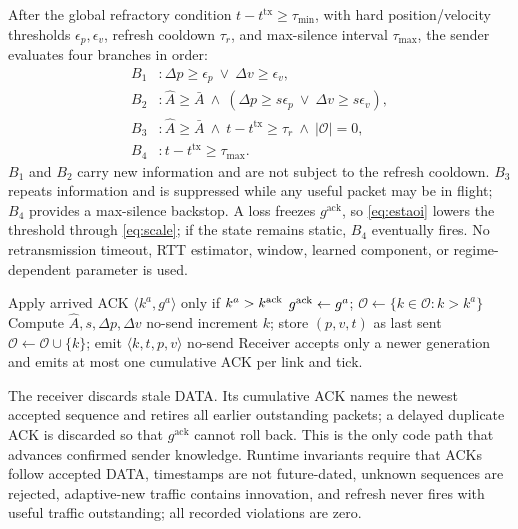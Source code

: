 After the global refractory condition
$t-t^{\mathrm{tx}}\geq\tau_{\min}$, with hard position/velocity thresholds
$\epsilon_p,\epsilon_v$, refresh cooldown $\tau_r$, and max-silence interval
$\tau_{\max}$, the sender evaluates four branches in order:
\begin{align}
 B_1 &: \Delta p\geq\epsilon_p\ \vee\ \Delta v\geq\epsilon_v,
 \label{eq:hard}\\
 B_2 &: \widehat A\geq\bar A\ \wedge\
 (\Delta p\geq s\epsilon_p\ \vee\ \Delta v\geq s\epsilon_v),
 \label{eq:adaptive}\\
 B_3 &: \widehat A\geq\bar A\ \wedge\
 t-t^{\mathrm{tx}}\geq\tau_r\ \wedge\ |\mathcal O|=0,
 \label{eq:refresh}\\
 B_4 &: t-t^{\mathrm{tx}}\geq\tau_{\max}.
 \label{eq:maxsilence}
\end{align}
$B_1$ and $B_2$ carry new information and are not subject to the refresh
cooldown. $B_3$ repeats information and is suppressed while any useful packet
may be in flight; $B_4$ provides a max-silence backstop. A loss freezes
$g^{\mathrm{ack}}$, so \eqref{eq:estaoi} lowers the threshold through
\eqref{eq:scale}; if the state remains static, $B_4$ eventually fires. No
retransmission timeout, RTT estimator, window, learned component, or
regime-dependent parameter is used.

\begin{algorithm}[t]
\caption{Sender and cumulative-ACK update, per channel}
\label{alg:sender}
\begin{algorithmic}[1]
\State Apply arrived ACK $\langle k^a,g^a\rangle$ only if $k^a>k^{\rm ack}$
\State $g^{\rm ack}\gets g^a$;
$\mathcal O\gets\{k\in\mathcal O:k>k^a\}$
\State Compute $\widehat A,s,\Delta p,\Delta v$
\If{$t-t^{\rm tx}<\tau_{\min}$} \State \Return no-send \EndIf
\If{$B_1$ or $B_2$ or $B_3$ or $B_4$}
 \State increment $k$; store $(p,v,t)$ as last sent
 \State $\mathcal O\gets\mathcal O\cup\{k\}$; emit $\langle k,t,p,v\rangle$
\Else \State \Return no-send \EndIf
\State Receiver accepts only a newer generation and emits at most one
cumulative ACK per link and tick.
\end{algorithmic}
\end{algorithm}

The receiver discards stale DATA. Its cumulative ACK names the newest accepted
sequence and retires all earlier outstanding packets; a delayed duplicate ACK
is discarded so that $g^{\mathrm{ack}}$ cannot roll back. This is the only
code path that advances confirmed sender knowledge. Runtime invariants require
that ACKs follow accepted DATA, timestamps are not future-dated, unknown
sequences are rejected, adaptive-new traffic contains innovation, and refresh
never fires with useful traffic outstanding; all recorded violations are zero.

